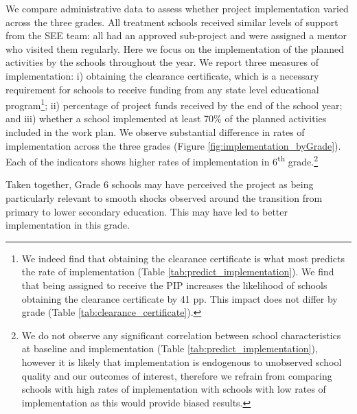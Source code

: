 \documentclass[11pt,a4paper]{article}
\begin{document}
We compare administrative data to assess whether project implementation varied across the three grades. All treatment schools received similar levels of support from the SEE team: all had an approved sub-project and were assigned a mentor who visited them regularly. Here we focus on the implementation of the planned activities by the schools throughout the year. We report three measures of implementation: i) obtaining the clearance certificate, which is a necessary requirement for schools to receive funding from any state level educational program\footnote{We indeed find that obtaining the clearance certificate is what most predicts the rate of implementation (Table \ref{tab:predict_implementation}). We find that being assigned to receive the PIP increases the likelihood of schools obtaining the clearance certificate by 41 pp. This impact does not differ by grade (Table \ref{tab:clearance_certificate}).}; ii) percentage of project funds received by the end of the school year; and iii) whether a school implemented at least 70\% of the planned activities included in the work plan. We observe substantial difference in rates of implementation across the three grades (Figure \ref{fig:implementation_byGrade}). Each of the indicators shows higher rates of implementation in 6\textsuperscript{th} grade.\footnote{We do not observe any significant correlation between school characteristics at baseline and implementation (Table \ref{tab:predict_implementation}), however it is likely that implementation is endogenous to unobserved school quality and our outcomes of interest, therefore we refrain from comparing schools with high rates of implementation with schools with low rates of implementation as this would provide biased results.} 

Taken together, Grade 6 schools may have perceived the project as being particularly relevant to smooth shocks observed around the transition from primary to lower secondary education. This may have led to better implementation in this grade. 
\end{document}
